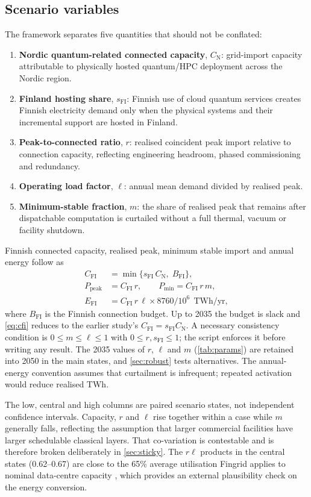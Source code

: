 \documentclass[11pt,a4paper]{article}
\newcommand{\Cfi}{C_{\mathrm{FI}}}
\newcommand{\CN}{C_{\mathrm{N}}}
\newcommand{\sFI}{s_{\mathrm{FI}}}
\begin{document}
\subsection{Scenario variables}
The framework separates five quantities that should not be conflated:
\begin{enumerate}
  \item \textbf{Nordic quantum-related connected capacity}, $\CN$: grid-import capacity attributable to physically hosted quantum/HPC deployment across the Nordic region.
  \item \textbf{Finland hosting share}, $\sFI$: Finnish use of cloud quantum services creates Finnish electricity demand only when the physical systems and their incremental support are hosted in Finland.
  \item \textbf{Peak-to-connected ratio}, $r$: realised coincident peak import relative to connection capacity, reflecting engineering headroom, phased commissioning and redundancy.
  \item \textbf{Operating load factor}, $\ell$: annual mean demand divided by realised peak.
  \item \textbf{Minimum-stable fraction}, $m$: the share of realised peak that remains after dispatchable computation is curtailed without a full thermal, vacuum or facility shutdown.
\end{enumerate}
Finnish connected capacity, realised peak, minimum stable import and annual energy follow as
\begin{align}
\Cfi &= \min\{\sFI\,\CN,\; B_{\mathrm{FI}}\}, \label{eq:cfi}\\
P_{\mathrm{peak}} &= \Cfi\, r, \qquad P_{\mathrm{min}} = \Cfi\, r\, m, \label{eq:peak}\\
E_{\mathrm{FI}} &= \Cfi\, r\, \ell \times 8760 / 10^{6}\ \ \text{TWh/yr}, \label{eq:energy}
\end{align}
where $B_{\mathrm{FI}}$ is the Finnish connection budget. Up to 2035 the budget is slack and \cref{eq:cfi} reduces to the earlier study's $\Cfi=\sFI\CN$. A necessary consistency condition is $0\le m\le \ell\le 1$ with $0\le r,\sFI\le1$; the script enforces it before writing any result. The 2035 values of $r$, $\ell$ and $m$ (\cref{tab:params}) are retained into 2050 in the main states, and \cref{sec:robust} tests alternatives. The annual-energy convention assumes that curtailment is infrequent; repeated activation would reduce realised TWh.

The low, central and high columns are paired scenario states, not independent confidence intervals. Capacity, $r$ and $\ell$ rise together within a case while $m$ generally falls, reflecting the assumption that larger commercial facilities have larger schedulable classical layers. That co-variation is contestable and is therefore broken deliberately in \cref{sec:sticky}. The $r\ell$ products in the central states (0.62--0.67) are close to the 65\% average utilisation Fingrid applies to nominal data-centre capacity \citep{fingrid2026prospects}, which provides an external plausibility check on the energy conversion.
\end{document}

